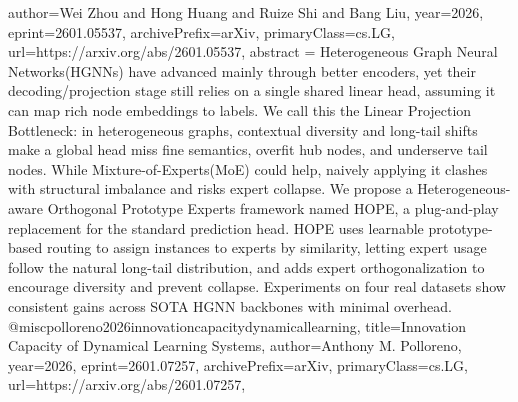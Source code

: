 {      author={Wei Zhou and Hong Huang and Ruize Shi and Bang Liu},
      year={2026},
      eprint={2601.05537},
      archivePrefix={arXiv},
      primaryClass={cs.LG},
      url={https://arxiv.org/abs/2601.05537},
      abstract = {Heterogeneous Graph Neural Networks(HGNNs) have advanced mainly through better encoders, yet their decoding/projection stage still relies on a single shared linear head, assuming it can map rich node embeddings to labels. We call this the Linear Projection Bottleneck: in heterogeneous graphs, contextual diversity and long-tail shifts make a global head miss fine semantics, overfit hub nodes, and underserve tail nodes. While Mixture-of-Experts(MoE) could help, naively applying it clashes with structural imbalance and risks expert collapse. We propose a Heterogeneous-aware Orthogonal Prototype Experts framework named HOPE, a plug-and-play replacement for the standard prediction head. HOPE uses learnable prototype-based routing to assign instances to experts by similarity, letting expert usage follow the natural long-tail distribution, and adds expert orthogonalization to encourage diversity and prevent collapse. Experiments on four real datasets show consistent gains across SOTA HGNN backbones with minimal overhead.}
}@misc{polloreno2026innovationcapacitydynamicallearning,
      title={Innovation Capacity of Dynamical Learning Systems}, 
      author={Anthony M. Polloreno},
      year={2026},
      eprint={2601.07257},
      archivePrefix={arXiv},
      primaryClass={cs.LG},
      url={https://arxiv.org/abs/2601.07257},
}

